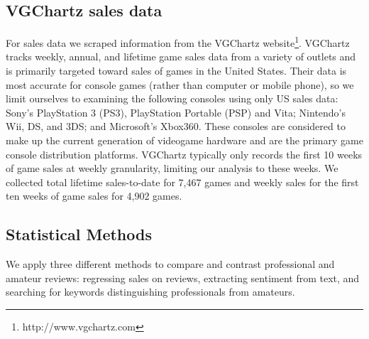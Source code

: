 \documentclass{sig-alternate}
\begin{document}
\subsection{VGChartz sales data}
For sales data we scraped information from the VGChartz website\footnote{http://www.vgchartz.com}. VGChartz tracks weekly, annual, and lifetime game sales data from a variety of outlets and is primarily targeted toward sales of games in the United States. Their data is most accurate for console games (rather than computer or mobile phone), so we limit ourselves to examining the following consoles using only US sales data: Sony's PlayStation 3 (PS3), PlayStation Portable (PSP) and Vita; Nintendo's Wii, DS, and 3DS; and Microsoft's Xbox360. These consoles are considered to make up the current generation of videogame hardware and are the primary game console distribution platforms. VGChartz typically only records the first 10 weeks of game sales at weekly granularity, limiting our analysis to these weeks. We collected total lifetime sales-to-date for 7,467 games and weekly sales for the first ten weeks of game sales for 4,902 games.

\subsection{Statistical Methods}
We apply three different methods to compare and contrast professional
and amateur reviews: regressing sales on reviews, extracting sentiment
from text, and searching for keywords distinguishing professionals from
amateurs.
\end{document}
